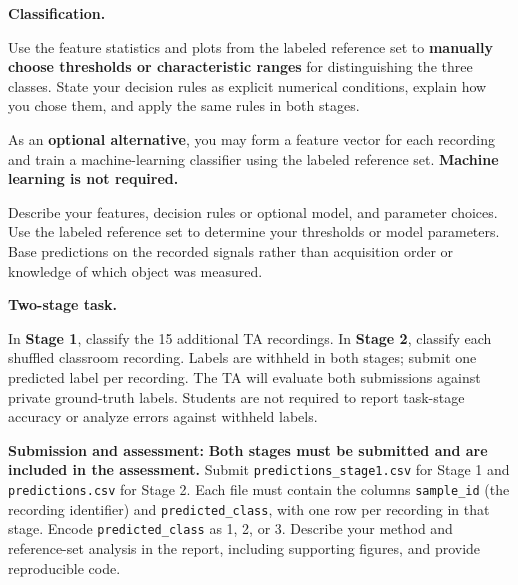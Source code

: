 \documentclass[11pt,a4paper]{article}
\begin{document}
\textbf{Classification.}

Use the feature statistics and plots from the labeled reference set to
\textbf{manually choose thresholds or characteristic ranges} for distinguishing
the three classes. State your decision rules as explicit numerical conditions,
explain how you chose them, and apply the same rules in both stages.

As an \textbf{optional alternative}, you may form a feature vector for each
recording and train a machine-learning classifier using the labeled reference
set. \textbf{Machine learning is not required.}

Describe your features, decision rules or optional model, and parameter choices.
Use the labeled reference set to determine your thresholds or model parameters.
Base predictions on the recorded signals rather than acquisition order or
knowledge of which object was measured.

\textbf{Two-stage task.}

In \textbf{Stage 1}, classify the 15 additional TA recordings. In
\textbf{Stage 2}, classify each shuffled classroom recording. Labels are withheld
in both stages; submit one predicted label per recording. The TA will evaluate
both submissions against private ground-truth labels. Students are not required
to report task-stage accuracy or analyze errors against withheld labels.

\textbf{Submission and assessment:} \textbf{Both stages must be submitted and
are included in the assessment.} Submit \texttt{predictions\_stage1.csv} for
Stage 1 and \texttt{predictions.csv} for Stage 2. Each file must contain the
columns \texttt{sample\_id} (the recording identifier) and
\texttt{predicted\_class}, with one row per recording in that stage. Encode
\texttt{predicted\_class} as 1, 2, or 3. Describe your method and reference-set analysis
in the report, including supporting figures, and provide reproducible code.
\end{document}
